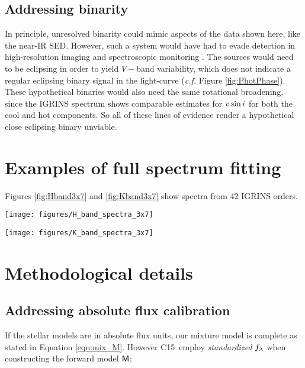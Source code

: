 \documentclass[twocolumn]{emulateapj}%
\newcommand{\iancze}{{\sc C15}}
\begin{document}
\subsection{Addressing binarity}
In principle, unresolved binarity could mimic aspects of the data shown here, like the near-IR SED.  However, such a system would have had to evade detection in high-resolution imaging \citep{kraus11,daemgen15} and spectroscopic monitoring \citep{nguyen12,donati14}.  The sources would need to be eclipsing in order to yield $V-$band variability, which does not indicate a regular eclipsing binary signal in the light-curve (\emph{c.f.} Figure \ref{fig:PhotPhase}).  These hypothetical binaries would also need the same rotational broadening, since the IGRINS spectrum shows comparable estimates for $v \sin i$ for both the cool and hot components.  So all of these lines of evidence render a hypothetical close eclipsing binary unviable.


\clearpage
\pagebreak


\appendix

\section{Examples of full spectrum fitting}

Figures \ref{fig:Hband3x7} and \ref{fig:Kband3x7} show spectra from 42 IGRINS orders.


\begin{figure*}
 \centering
 \texttt{[image: figures/H\_band\_spectra\_3x7]}
 \caption{IGRINS Orders 94 and $99-119$.  Note that the $y-$axis is on a logarithmic scale.  }
 \label{fig:Hband3x7}
\end{figure*}

\begin{figure*}
 \centering
 \texttt{[image: figures/K\_band\_spectra\_3x7]}
 \caption{IGRINS Orders $73-93$.  Note that the $y-$axis is on a logarithmic scale.  }
 \label{fig:Kband3x7}
\end{figure*}


\section{Methodological details}
\label{methods-details}

\subsection{Addressing absolute flux calibration}
If the stellar models are in absolute flux units, our mixture model is complete as stated in Equation \ref{eqn:mix_M}.  However \iancze\ employ \emph{standardized} $f_\lambda$ when constructing the forward model $\mathsf{M}$:
\end{document}
